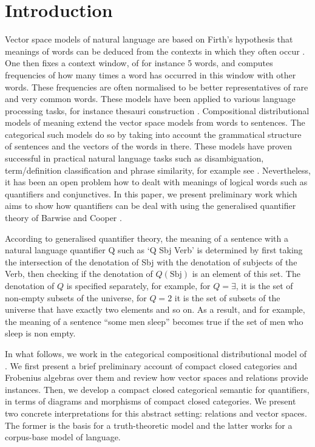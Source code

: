 \section{Introduction}

Vector space models of natural language are based on Firth's hypothesis that  meanings of words can be deduced from the contexts in which they often occur  \cite{Firth}.  One then fixes a context window, of for instance 5 words, and computes frequencies of how many times a word has occurred in this window with other words. These frequencies are often normalised to be better representatives of rare and very common words. These models have been applied to various language processing tasks, for instance thesauri construction \cite{Curran}.  Compositional distributional models of meaning extend the vector space models from words to sentences. The categorical such models \cite{Coeckeetal,BaroniZam} do so by taking into account the grammatical structure of sentences and the vectors of the words in there.  These models have proven successful in practical natural language tasks such as disambiguation, term/definition classification and phrase similarity, for example see \cite{GrefenSadr,kartsaklis2012}. Nevertheless, it has been an open problem how to dealt with  meanings of logical words such as  quantifiers and conjunctives. In this paper, we present preliminary work which aims to show how quantifiers can be deal with using the generalised quantifier  theory  of Barwise and Cooper \cite{BarwiseCooper81}. 

According to  generalised quantifier theory, the meaning of a sentence with a natural language  quantifier Q such as  `Q Sbj Verb' is determined by first taking the intersection of the denotation of Sbj with the denotation of subjects of the Verb, then checking if the denotation of $Q(\text{Sbj})$ is an element of this set. The denotation of $Q$ is specified separately, for example, for $Q = \exists$, it is the set of non-empty subsets of the universe, for $Q = 2$ it is  the set of  subsets of the universe that have exactly two elements and so on. As a result, and for example, the meaning of a sentence ``some men sleep'' becomes  true if the set of men who sleep is non empty. 


In what follows,  we work in the categorical compositional distributional model of \cite{Coeckeetal}. We  first present  a brief preliminary account of compact closed categories and Frobenius algebras over them and review  how vector spaces and relations provide instances. Then, we develop a compact closed categorical semantic for quantifiers, in terms of diagrams and morphisms of compact closed categories. We present two concrete interpretations for this abstract setting: relations and vector spaces. The former is the basis for  a truth-theoretic model and the latter works for a corpus-base model of language. 

